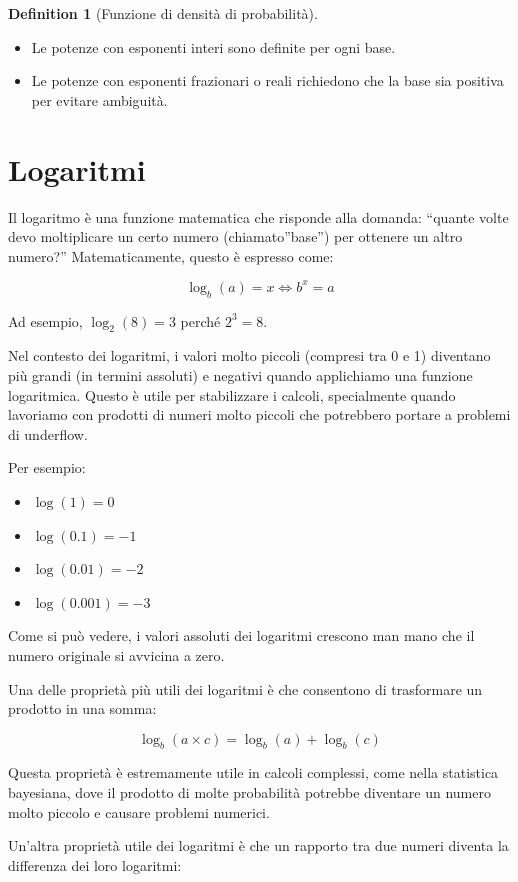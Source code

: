\documentclass[
  letterpaper,
  DIV=11,
  numbers=noendperiod,
  oneside]{scrreprt}
\providecommand{\tightlist}{%
  \setlength{\itemsep}{0pt}\setlength{\parskip}{0pt}}
\theoremstyle{definition}
\theoremstyle{plain}
\theoremstyle{definition}
\newtheorem{definition}{Definition}[chapter]
\theoremstyle{remark}
\begin{document}
\begin{definition}[Funzione di densità di
probabilità]
\begin{itemize}
\tightlist
\item
  Le potenze con esponenti interi sono definite per ogni base.
\item
  Le potenze con esponenti frazionari o reali richiedono che la base sia
  positiva per evitare ambiguità.
\end{itemize}

\section{Logaritmi}\label{logaritmi}

Il logaritmo è una funzione matematica che risponde alla domanda:
``quante volte devo moltiplicare un certo numero (chiamato''base'') per
ottenere un altro numero?'' Matematicamente, questo è espresso come:

\[
\log_b(a) = x \iff b^x = a
\]

Ad esempio, \(\log_2(8) = 3\) perché \(2^3 = 8\).

Nel contesto dei logaritmi, i valori molto piccoli (compresi tra 0 e 1)
diventano più grandi (in termini assoluti) e negativi quando applichiamo
una funzione logaritmica. Questo è utile per stabilizzare i calcoli,
specialmente quando lavoriamo con prodotti di numeri molto piccoli che
potrebbero portare a problemi di underflow.

Per esempio:

\begin{itemize}
\tightlist
\item
  \(\log(1) = 0\)
\item
  \(\log(0.1) = -1\)
\item
  \(\log(0.01) = -2\)
\item
  \(\log(0.001) = -3\)
\end{itemize}

Come si può vedere, i valori assoluti dei logaritmi crescono man mano
che il numero originale si avvicina a zero.

Una delle proprietà più utili dei logaritmi è che consentono di
trasformare un prodotto in una somma:

\[
\log_b(a \times c) = \log_b(a) + \log_b(c)
\]

Questa proprietà è estremamente utile in calcoli complessi, come nella
statistica bayesiana, dove il prodotto di molte probabilità potrebbe
diventare un numero molto piccolo e causare problemi numerici.

Un'altra proprietà utile dei logaritmi è che un rapporto tra due numeri
diventa la differenza dei loro logaritmi:


\end{definition}
\end{document}
